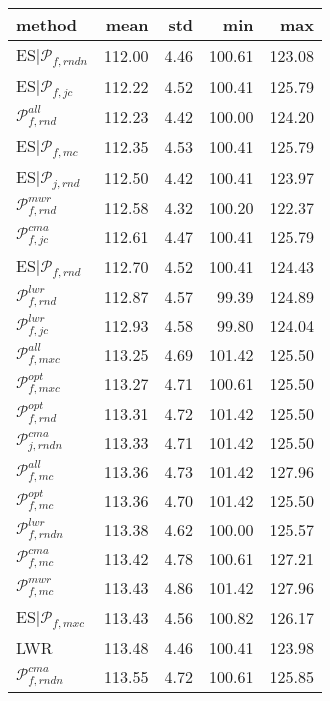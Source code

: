 \begin{tabular}{|@{}l@{}|@{}r@{}|@{}r@{}|@{}r@{}|@{}r@{}|}\hline
method & mean & std & min & max \\ \hline\hline
ES\boldmath$|\mathcal{P}_{f,rndn}$ &  112.00 &  4.46 &  100.61 &  123.08  \\ 
ES$|{\mathcal{P}_{f,jc}}$ &  112.22 &  4.52 &  100.41 &  125.79  \\ 
${\mathcal{P}_{f,rnd}^{all}}$ &  112.23 &  4.42 &  100.00 &  124.20  \\ 
ES$|{\mathcal{P}_{f,mc}}$ &  112.35 &  4.53 &  100.41 &  125.79  \\ 
ES$|{\mathcal{P}_{j,rnd}}$ &  112.50 &  4.42 &  100.41 &  123.97  \\ 
${\mathcal{P}_{f,rnd}^{mwr}}$ &  112.58 &  4.32 &  100.20 &  122.37  \\ 
${\mathcal{P}_{f,jc}^{cma}}$ &  112.61 &  4.47 &  100.41 &  125.79  \\ 
ES$|{\mathcal{P}_{f,rnd}}$ &  112.70 &  4.52 &  100.41 &  124.43  \\ 
${\mathcal{P}_{f,rnd}^{lwr}}$ &  112.87 &  4.57 &  99.39 &  124.89  \\ 
${\mathcal{P}_{f,jc}^{lwr}}$ &  112.93 &  4.58 &  99.80 &  124.04  \\ 
${\mathcal{P}_{f,mxc}^{all}}$ &  113.25 &  4.69 &  101.42 &  125.50  \\ 
${\mathcal{P}_{f,mxc}^{opt}}$ &  113.27 &  4.71 &  100.61 &  125.50  \\ 
${\mathcal{P}_{f,rnd}^{opt}}$ &  113.31 &  4.72 &  101.42 &  125.50  \\ 
${\mathcal{P}_{j,rndn}^{cma}}$ &  113.33 &  4.71 &  101.42 &  125.50  \\ 
${\mathcal{P}_{f,mc}^{all}}$ &  113.36 &  4.73 &  101.42 &  127.96  \\ 
${\mathcal{P}_{f,mc}^{opt}}$ &  113.36 &  4.70 &  101.42 &  125.50  \\ 
\boldmath${\mathcal{P}_{f,rndn}^{lwr}}$ &  113.38 &  4.62 &  100.00 &  125.57  \\ 
${\mathcal{P}_{f,mc}^{cma}}$ &  113.42 &  4.78 &  100.61 &  127.21  \\ 
${\mathcal{P}_{f,mc}^{mwr}}$ &  113.43 &  4.86 &  101.42 &  127.96  \\ 
ES$|{\mathcal{P}_{f,mxc}}$ &  113.43 &  4.56 &  100.82 &  126.17  \\ 
LWR &  113.48 &  4.46 &  100.41 &  123.98  \\ 
\boldmath${\mathcal{P}_{f,rndn}^{cma}}$ &  113.55 &  4.72 &  100.61 &  125.85  \\ 

\end{tabular}
